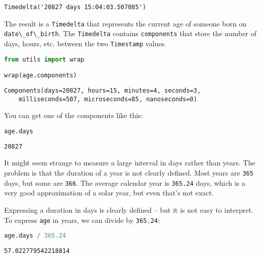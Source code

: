 \begin{lstlisting}[style=output]
Timedelta('20827 days 15:04:03.507085')
\end{lstlisting}

The result is a \passthrough{\lstinline!Timedelta!} that represents the
current age of someone born on
\passthrough{\lstinline!date\_of\_birth!}. The
\passthrough{\lstinline!Timedelta!} contains
\passthrough{\lstinline!components!} that store the number of days,
hours, etc. between the two \passthrough{\lstinline!Timestamp!} values.

\begin{lstlisting}[language=Python,style=source]
from utils import wrap

wrap(age.components)
\end{lstlisting}

\begin{lstlisting}[style=output]
Components(days=20827, hours=15, minutes=4, seconds=3,
    milliseconds=507, microseconds=85, nanoseconds=0)
\end{lstlisting}

\pagebreak

You can get one of the components like this:

\begin{lstlisting}[language=Python,style=source]
age.days
\end{lstlisting}

\begin{lstlisting}[style=output]
20827
\end{lstlisting}

It might seem strange to measure a large interval in days rather than
years. The problem is that the duration of a year is not clearly
defined. Most years are \passthrough{\lstinline!365!} days, but some are
\passthrough{\lstinline!366!}. The average calendar year is
\passthrough{\lstinline!365.24!} days, which is a very good
approximation of a solar year, but even that's not exact.

Expressing a duration in days is clearly defined -- but it is not easy
to interpret. To express \passthrough{\lstinline!age!} in years, we can
divide by \passthrough{\lstinline!365.24!}:

\begin{lstlisting}[language=Python,style=source]
age.days / 365.24
\end{lstlisting}

\begin{lstlisting}[style=output]
57.022779542218814
\end{lstlisting}

